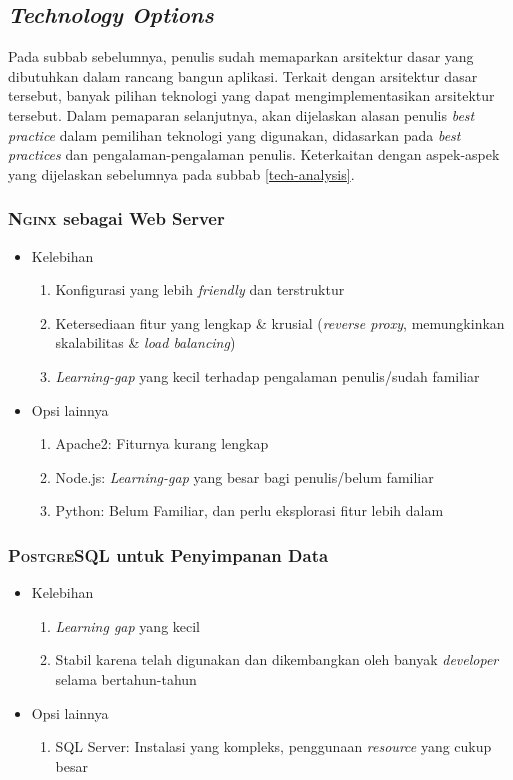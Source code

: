 
\subsection{\textit{Technology Options}}
\label{tech-options}

	Pada subbab sebelumnya, penulis sudah memaparkan arsitektur dasar yang dibutuhkan dalam rancang bangun aplikasi. Terkait dengan arsitektur dasar tersebut, banyak pilihan teknologi yang dapat mengimplementasikan arsitektur tersebut. Dalam pemaparan selanjutnya, akan dijelaskan alasan penulis \textit{best practice} dalam pemilihan teknologi yang digunakan, didasarkan pada \textit{best practices} dan pengalaman-pengalaman penulis. Keterkaitan dengan aspek-aspek yang dijelaskan sebelumnya pada subbab \ref{tech-analysis}.
	
	\subsubsection{\textsc{Nginx} sebagai Web Server}
		\begin{itemize}
			\item Kelebihan
				\begin{enumerate}
					\item Konfigurasi yang lebih \textit{friendly} dan terstruktur
					\item Ketersediaan fitur yang lengkap \& krusial (\textit{reverse proxy}, memungkinkan skalabilitas \& \textit{load balancing})
					\item \textit{Learning-gap} yang kecil terhadap pengalaman penulis/sudah familiar
				\end{enumerate}
			\item Opsi lainnya
				\begin{enumerate}
					\item Apache2:  Fiturnya kurang lengkap
					\item Node.js:  \textit{Learning-gap} yang besar bagi penulis/belum familiar
					\item Python:  Belum Familiar, dan perlu eksplorasi fitur lebih dalam
				\end{enumerate}
		\end{itemize}
	
	\subsubsection{\textsc{PostgreSQL} untuk Penyimpanan Data}
	\begin{itemize}
		\item Kelebihan
		\begin{enumerate}
			\item \textit{Learning gap} yang kecil
			\item Stabil karena telah digunakan dan dikembangkan oleh banyak \textit{developer} selama bertahun-tahun
		\end{enumerate}
		\item Opsi lainnya
		\begin{enumerate}
			\item SQL Server:  Instalasi yang kompleks, penggunaan \textit{resource} yang cukup besar
		\end{enumerate}
	\end{itemize}
	

